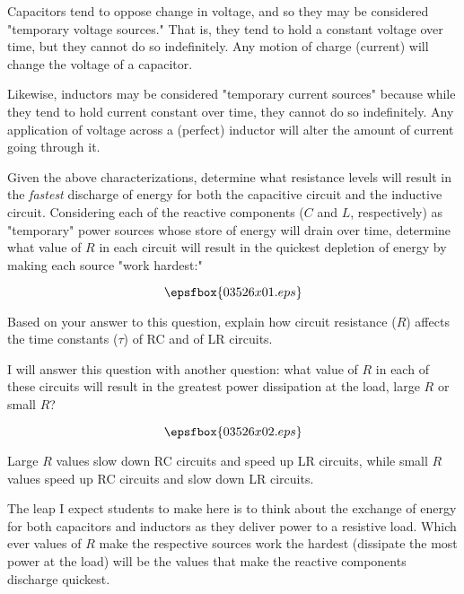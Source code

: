 

Capacitors tend to oppose change in voltage, and so they may be considered "temporary voltage sources."  That is, they tend to hold a constant voltage over time, but they cannot do so indefinitely.  Any motion of charge (current) will change the voltage of a capacitor.

Likewise, inductors may be considered "temporary current sources" because while they tend to hold current constant over time, they cannot do so indefinitely.  Any application of voltage across a (perfect) inductor will alter the amount of current going through it.

\vskip 10pt

Given the above characterizations, determine what resistance levels will result in the {\it fastest} discharge of energy for both the capacitive circuit and the inductive circuit.  Considering each of the reactive components ($C$ and $L$, respectively) as "temporary" power sources whose store of energy will drain over time, determine what value of $R$ in each circuit will result in the quickest depletion of energy by making each source "work hardest:"

$$\epsfbox{03526x01.eps}$$

Based on your answer to this question, explain how circuit resistance ($R$) affects the time constants ($\tau$) of RC and of LR circuits.







I will answer this question with another question: what value of $R$ in each of these circuits will result in the greatest power dissipation at the load, large $R$ or small $R$?

$$\epsfbox{03526x02.eps}$$

Large $R$ values slow down RC circuits and speed up LR circuits, while small $R$ values speed up RC circuits and slow down LR circuits.







The leap I expect students to make here is to think about the exchange of energy for both capacitors and inductors as they deliver power to a resistive load.  Which ever values of $R$ make the respective sources work the hardest (dissipate the most power at the load) will be the values that make the reactive components discharge quickest.




